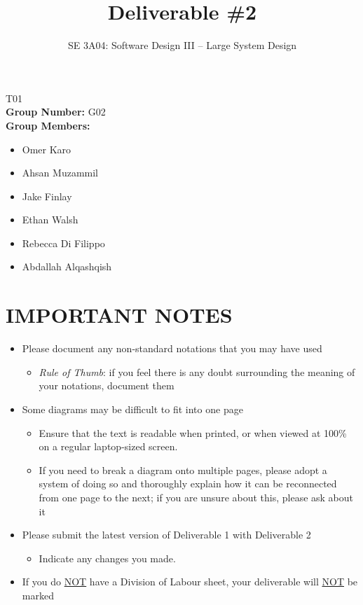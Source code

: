 \documentclass[]{article}
\title{Deliverable \#2}
\author{SE 3A04: Software Design III -- Large System Design}
\date{}
\begin{document}
\maketitle	
{} T01\\
{\bf Group Number:} G02 \\
{\bf Group Members:} 
\begin{itemize}
	\item Omer Karo
	\item Ahsan Muzammil
	\item Jake Finlay
	\item Ethan Walsh
	\item Rebecca Di Filippo
	\item Abdallah Alqashqish
\end{itemize}

\section*{IMPORTANT NOTES}
\begin{itemize}
	\item Please document any non-standard notations that you may have used
	\begin{itemize}
		\item \emph{Rule of Thumb}: if you feel there is any doubt surrounding the meaning of your notations, document them
	\end{itemize}
	\item Some diagrams may be difficult to fit into one page
	\begin{itemize}
		\item Ensure that the text is readable when printed, or when viewed at 100\% on a regular laptop-sized screen.
		\item If you need to break a diagram onto multiple pages, please adopt a system of doing so and thoroughly explain how it can be reconnected from one page to the next; if you are unsure about this, please ask about it
	\end{itemize}
	\item Please submit the latest version of Deliverable 1 with Deliverable 2
	\begin{itemize}
		\item Indicate any changes you made.
	\end{itemize}
	\item If you do \underline{NOT} have a Division of Labour sheet, your deliverable will \underline{NOT} be marked
\end{itemize}
\end{document}
